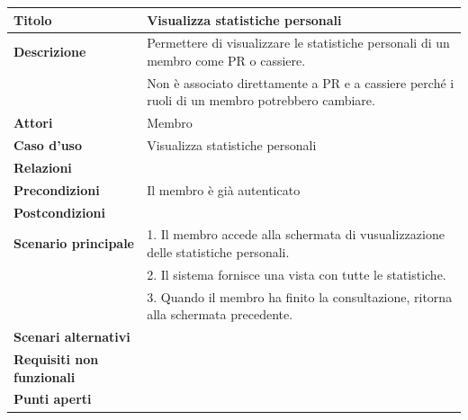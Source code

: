 \documentclass[a4paper]{article}
\begin{document}
\begin{center}
\begin{tabularx}{1\textwidth}{|l|X|}
    \hline
	\textbf{Titolo} & Visualizza statistiche personali \\
	\hline
	\textbf{Descrizione} & Permettere di visualizzare le statistiche personali di un membro come PR o cassiere. \\
						 & Non è associato direttamente a PR e a cassiere perché i ruoli di un membro potrebbero cambiare.\\
	\hline
	\textbf{Attori} & Membro \\
	\hline
	\textbf{Caso d'uso} & Visualizza statistiche personali \\
	\hline
	\textbf{Relazioni} &  \\
	\hline
	\textbf{Precondizioni} & Il membro è già autenticato  \\
	\hline
	\textbf{Postcondizioni} &  \\
	\hline
	\textbf{Scenario principale} & 1. Il membro accede alla schermata di vusualizzazione delle statistiche personali.\\
								 & 2. Il sistema fornisce una vista con tutte le statistiche. \\
								 & 3. Quando il membro ha finito la consultazione, ritorna alla schermata precedente.\\
	\hline
	\textbf{Scenari alternativi} & \\
	\hline
	\textbf{Requisiti non funzionali} & \\
	\hline
	\textbf{Punti aperti} & \\
	\hline
\end{tabularx}
\end{center}

\end{document}
